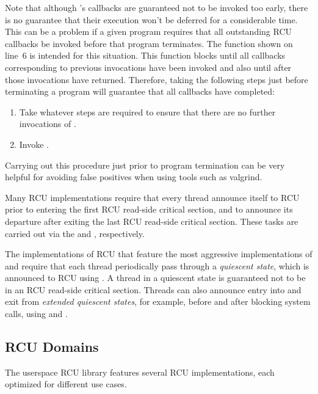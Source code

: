 \documentclass[letterpaper,10pt]{article}
\begin{document}
Note that although 's callbacks are guaranteed not to be
invoked too early, there is no guarantee that their execution won't be
deferred for a considerable time.
This can be a problem if a given program requires that all outstanding
RCU callbacks be invoked before that program terminates.
The  function shown on line~6 is intended for this
situation.
This function blocks until all callbacks corresponding to previous
 invocations have been invoked and also until after
those invocations have returned.
Therefore, taking the following steps just before terminating a program
will guarantee that all callbacks have completed:

\begin{enumerate}
\item	Take whatever steps are required to ensure that there are no
	further invocations of .
\item	Invoke .
\end{enumerate}

Carrying out this procedure just prior to program termination can be very
helpful for avoiding false positives when using tools such as valgrind.

Many RCU implementations require that every thread announce itself to
RCU prior to entering the first RCU read-side critical section, and
to announce its departure after exiting the last RCU read-side
critical section.
These tasks are carried out via the  and
, respectively.

The implementations of RCU that feature the most aggressive implementations of
 and  require that each thread
periodically pass through a \emph{quiescent state}, which is announced to RCU
using .
A thread in a quiescent state is guaranteed not to be in an RCU
read-side critical section.
Threads can also announce entry into and exit from \emph{extended
quiescent states}, for example, before and after blocking system
calls, using  and .

\subsection{RCU Domains}
\label{sec:RCU Domains}

The userspace RCU library features several RCU implementations, each
optimized for different use cases.
\end{document}

